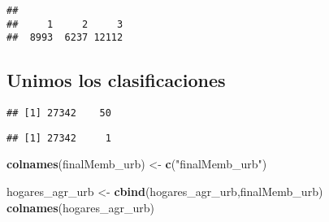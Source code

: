 \documentclass[11pt,]{article}
\newenvironment{Shaded}{\begin{snugshade}}{\end{snugshade}}
\newcommand{\KeywordTok}[1]{\textcolor[rgb]{0.13,0.29,0.53}{\textbf{#1}}}
\newcommand{\DecValTok}[1]{\textcolor[rgb]{0.00,0.00,0.81}{#1}}
\newcommand{\StringTok}[1]{\textcolor[rgb]{0.31,0.60,0.02}{#1}}
\newcommand{\OperatorTok}[1]{\textcolor[rgb]{0.81,0.36,0.00}{\textbf{#1}}}
\newcommand{\NormalTok}[1]{#1}
\begin{document}
\begin{verbatim}
## 
##     1     2     3 
##  8993  6237 12112
\end{verbatim}

\subsection{Unimos los
clasificaciones}\label{unimos-los-clasificaciones-1}

\begin{Shaded}
\end{Shaded}

\begin{verbatim}
## [1] 27342    50
\end{verbatim}

\begin{Shaded}
\end{Shaded}

\begin{verbatim}
## [1] 27342     1
\end{verbatim}

\begin{Shaded}
\begin{Highlighting}[]
\KeywordTok{colnames}\NormalTok{(finalMemb_urb) <-}\StringTok{ }\KeywordTok{c}\NormalTok{(}\StringTok{"finalMemb_urb"}\NormalTok{) }

\NormalTok{hogares_agr_urb <-}\StringTok{ }\KeywordTok{cbind}\NormalTok{(hogares_agr_urb,finalMemb_urb)}
\KeywordTok{colnames}\NormalTok{(hogares_agr_urb)}
\end{Highlighting}
\end{Shaded}
\end{document}
